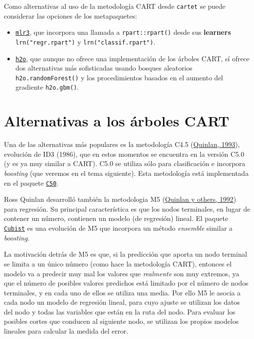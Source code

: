 \documentclass[
  spanish,
]{book}
\providecommand{\tightlist}{%
  \setlength{\itemsep}{0pt}\setlength{\parskip}{0pt}}
\theoremstyle{break}
\theoremstyle{definition}
\theoremstyle{definition}
\theoremstyle{definition}
\theoremstyle{definition}
\theoremstyle{remark}
\begin{document}
Como alternativas al uso de la metodología CART desde \texttt{cartet} se puede considerar las opciones de los metapaquetes:

\begin{itemize}
\tightlist
\item
  \href{https://mlr3book.mlr-org.com/mlr3book.pdf}{\texttt{mlr3}}, que incorpora una llamada a \texttt{rpart::rpart()} desde sus \textbf{learners} \texttt{lrn("regr.rpart")} y \texttt{lrn("classif.rpart")}.
\item
  \href{https://www.h2o.ai/blog/finally-you-can-plot-h2o-decision-trees-in-r/}{\texttt{h2o}}, que aunque no ofrece una implementación de los árboles CART, sí ofrece dos alternativas más sofisticadas usando bosques aleatorios \texttt{h2o.randomForest()} y los procedimientos basados en el aumento del gradiente \texttt{h2o.gbm()}.
\end{itemize}

\hypertarget{alternativas-a-los-uxe1rboles-cart}{%
\section{Alternativas a los árboles CART}\label{alternativas-a-los-uxe1rboles-cart}}

Una de las alternativas más populares es la metodología C4.5 (\protect\hyperlink{ref-quinlan1993c4}{Quinlan, 1993}), evolución de ID3 (1986), que en estos momentos se encuentra en la versión C5.0 (y es ya muy similar a CART).
C5.0 se utiliza sólo para clasificación e incorpora \emph{boosting} (que veremos en el tema siguiente).
Esta metodología está implementada en el paquete \href{https://topepo.github.io/C5.0/index.html}{\texttt{C50}}.

Ross Quinlan desarrolló también la metodologia M5 (\protect\hyperlink{ref-quinlan1992learning}{Quinlan y others, 1992}) para regresión.
Su principal característica es que los nodos terminales, en lugar de contener un número, contienen un modelo (de regresión) lineal.
El paquete \href{https://topepo.github.io/Cubist}{\texttt{Cubist}} es una evolución de M5 que incorpora un método \emph{ensemble} similar a \emph{boosting}.

La motivación detrás de M5 es que, si la predicción que aporta un nodo terminal se limita a un único número (como hace la metodología CART), entonces el modelo va a predecir muy mal los valores que \emph{realmente} son muy extremos, ya que el número de posibles valores predichos está limitado por el número de nodos terminales, y en cada uno de ellos se utiliza una media.
Por ello M5 le asocia a cada nodo un modelo de regresión lineal, para cuyo ajuste se utilizan los datos del nodo y todas las variables que están en la ruta del nodo.
Para evaluar los posibles cortes que conducen al siguiente nodo, se utilizan los propios modelos lineales para calcular la medida del error.
\end{document}
